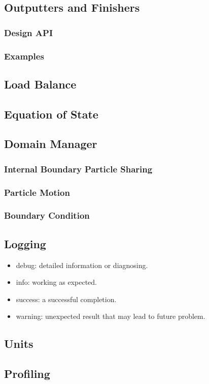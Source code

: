 \subsection{Outputters and Finishers}
\label{sec.outputters}
\subsubsection{Design API}
\subsubsection{Examples}

\subsection{Load Balance}

\subsection{Equation of State}

\subsection{Domain Manager}
\subsubsection{Internal Boundary Particle Sharing}
\subsubsection{Particle Motion}
\subsubsection{Boundary Condition}

\subsection{Logging}
\label{sec.logging}
\begin{itemize}
	\item debug: detailed information or diagnosing.
    \item info: working as expected.
    \item success: a successful completion. 
    \item warning: unexpected result that may lead to future problem.
\end{itemize}

\subsection{Units}

\subsection{Profiling}
